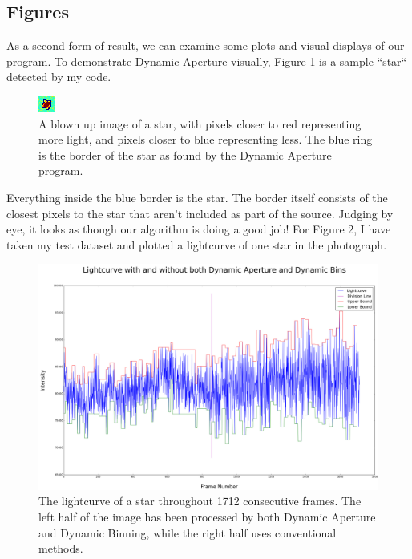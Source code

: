 \documentclass[12pt]{article}
\begin{document}
\subsection{Figures}
\indent \indent As a second form of result, we can examine some plots and visual displays of our program. To demonstrate Dynamic Aperture visually, Figure 1 is a sample ``star`` detected by my code. 
\begin{figure}[h]
\begin{center}
\includegraphics[scale = 10]{small}
\caption{A blown up image of a star, with pixels closer to red representing more light, and pixels closer to blue representing less. The blue ring is the border of the star as found by the Dynamic Aperture program.}
\end{center}
\end{figure}
Everything inside the blue border is the star. The border itself consists of the closest pixels to the star that aren't included as part of the source. Judging by eye, it looks as though our algorithm is doing a good job! For Figure 2, I have taken my test dataset and plotted a lightcurve of one star in the photograph. 
\begin{figure}[p]
\begin{center}
\includegraphics[scale = 0.3]{lightcurve_split}
\caption{The lightcurve of a star throughout 1712 consecutive frames. The left half of the image has been processed by both Dynamic Aperture and Dynamic Binning, while the right half uses conventional methods.}
\end{center}
\end{figure}
\end{document}
